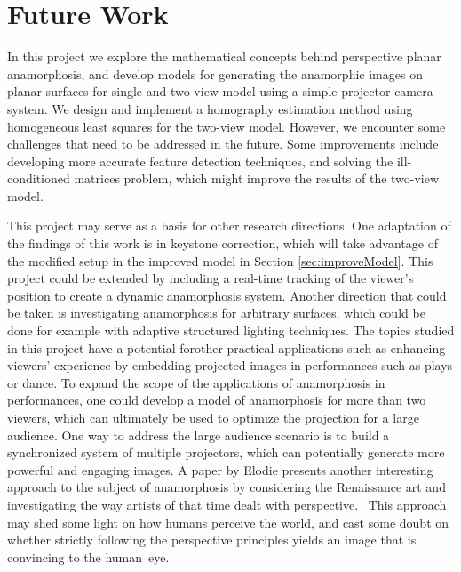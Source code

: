 \documentclass[11pt, oneside, reqno]{book}
\begin{document}

\chapter{Future Work}
\label{ch:futureWork}




In this project we explore the mathematical concepts behind perspective planar anamorphosis, and develop models for generating the anamorphic images on planar surfaces for single and two-view model using a simple projector-camera system. We design and implement a homography estimation method using homogeneous least squares for the two-view model. However, we encounter some challenges that need to be addressed in the future. Some improvements include developing more accurate feature detection techniques, and solving the ill-conditioned matrices problem, which might improve the results of the two-view model.

This project may serve as a basis for other research directions. One adaptation of the findings of this work is in keystone correction, which will take advantage of the modified setup in the improved model in Section \ref{sec:improveModel}. This project could be extended by including a real-time tracking of the viewer's position to create a dynamic anamorphosis system. Another direction that could be taken is investigating anamorphosis for arbitrary surfaces, which could be done for example with adaptive structured lighting techniques. The topics studied in this project have a potential forother practical applications such as enhancing viewers' experience by embedding projected images in performances such as plays or dance. To expand the scope of the applications of anamorphosis in performances, one could develop a model of anamorphosis for more than two viewers, which can ultimately be used to optimize the projection for a large audience. One way to address the large audience scenario is to build a synchronized system of multiple projectors, which can potentially generate more powerful and engaging images. A paper by Elodie presents another interesting approach to the subject of anamorphosis by considering the Renaissance art and investigating the way artists of that time dealt with perspective.~\cite{fourquet2010learning} This approach may shed some light on how humans perceive the world, and cast some doubt on whether strictly following the perspective principles yields an image that is convincing to the human~eye.
\end{document}
